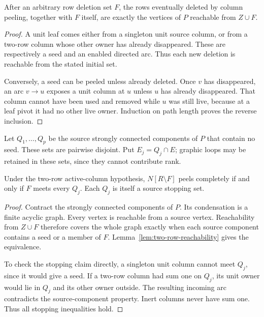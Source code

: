 \begin{lemma}
\label{lem:two-row-reachability}
After an arbitrary row deletion set $F$, the rows eventually deleted by
column peeling, together with $F$ itself, are exactly the vertices of $P$
reachable from $Z\cup F$.
\end{lemma}
\begin{proof}
A unit leaf comes either from a singleton unit source column, or from a
two-row column whose other owner has already disappeared.  These are
respectively a seed and an enabled directed arc.  Thus each new deletion
is reachable from the stated initial set.

Conversely, a seed can be peeled unless already deleted.  Once $v$ has
disappeared, an arc $v\to u$ exposes a unit column at $u$ unless $u$ has
already disappeared.  That column cannot have been used and removed
while $u$ was still live, because at a leaf pivot it had no other live
owner.  Induction on path length proves the reverse inclusion.
\end{proof}

Let $Q_1,\ldots,Q_p$ be the source strongly connected components of $P$
that contain no seed.  These sets are pairwise disjoint.  Put
$E_j=Q_j\cap E$; graphic loops may be retained in these sets, since they
cannot contribute rank.

\begin{theorem}
\label{thm:source-scc-obligations}
Under the two-row active-column hypothesis, $N[R\setminus F]$ peels
completely if and only if $F$ meets every $Q_j$.  Each $Q_j$ is itself a
source stopping set.
\end{theorem}
\begin{proof}
Contract the strongly connected components of $P$.  Its condensation is
a finite acyclic graph.  Every vertex is reachable from a source vertex.
Reachability from $Z\cup F$ therefore covers the whole graph exactly
when each source component contains a seed or a member of $F$.
Lemma~\ref{lem:two-row-reachability} gives the equivalence.

To check the stopping claim directly, a singleton unit column cannot
meet $Q_j$, since it would give a seed.  If a two-row column had sum one
on $Q_j$, its unit owner would lie in $Q_j$ and its other owner outside.
The resulting incoming arc contradicts the source-component property.
Inert columns never have sum one.  Thus all stopping inequalities hold.
\end{proof}

